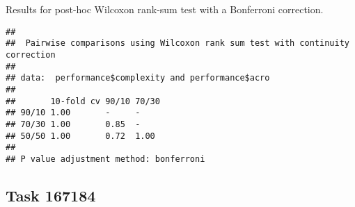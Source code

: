 \documentclass[
]{book}
\newenvironment{Shaded}{\begin{snugshade}}{\end{snugshade}}
\newcommand{\AttributeTok}[1]{\textcolor[rgb]{0.13,0.29,0.53}{#1}}
\newcommand{\ConstantTok}[1]{\textcolor[rgb]{0.56,0.35,0.01}{#1}}
\newcommand{\FunctionTok}[1]{\textcolor[rgb]{0.13,0.29,0.53}{\textbf{#1}}}
\newcommand{\NormalTok}[1]{#1}
\newcommand{\SpecialCharTok}[1]{\textcolor[rgb]{0.81,0.36,0.00}{\textbf{#1}}}
\newcommand{\StringTok}[1]{\textcolor[rgb]{0.31,0.60,0.02}{#1}}
\begin{document}
Results for post-hoc Wilcoxon rank-sum test with a Bonferroni correction.

\begin{Shaded}
\end{Shaded}

\begin{verbatim}
## 
##  Pairwise comparisons using Wilcoxon rank sum test with continuity correction 
## 
## data:  performance$complexity and performance$acro 
## 
##       10-fold cv 90/10 70/30
## 90/10 1.00       -     -    
## 70/30 1.00       0.85  -    
## 50/50 1.00       0.72  1.00 
## 
## P value adjustment method: bonferroni
\end{verbatim}

\hypertarget{task-167184-1}{%
\subsection{Task 167184}\label{task-167184-1}}
\end{document}
